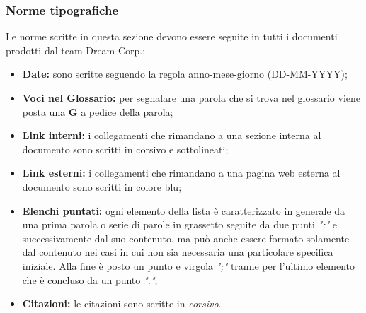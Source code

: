 		\subsubsection{Norme tipografiche}
			Le norme scritte in questa sezione devono essere seguite in tutti i documenti prodotti dal team Dream Corp.:
			\begin{itemize}
				\item \textbf{Date:} sono scritte seguendo la regola anno-mese-giorno (DD-MM-YYYY);
				\item \textbf{Voci nel Glossario:} per segnalare una parola che si trova nel glossario viene posta una \textbf{G} a pedice della parola;
				\item \textbf{Link interni:} i collegamenti che rimandano a una sezione interna al documento sono scritti in corsivo e sottolineati;
				\item \textbf{Link esterni:} i collegamenti che rimandano a una pagina web esterna al documento sono scritti in colore blu;
				\item \textbf{Elenchi puntati:} ogni elemento della lista è caratterizzato in generale da una prima parola o serie di parole in grassetto seguite da due punti \textit{":"} e successivamente dal suo contenuto, ma può anche essere formato solamente dal contenuto nei casi in cui non sia necessaria una particolare specifica iniziale. Alla fine è posto un punto e virgola \textit{";"} tranne per l'ultimo elemento che è concluso da un punto \textit{"."};
				\item \textbf{Citazioni:} le citazioni sono scritte in \textit{corsivo}.
			\end{itemize}
